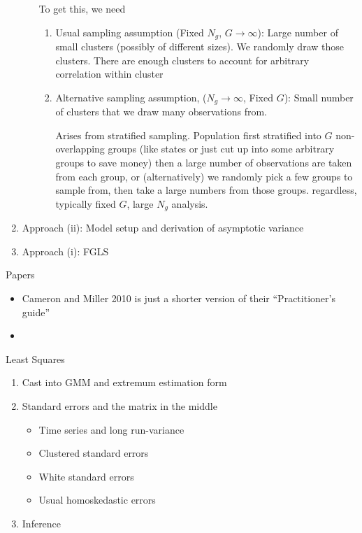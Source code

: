 \documentclass[12pt]{article}
\theoremstyle{plain}
\theoremstyle{definition}
\theoremstyle{remark}
\newcommand{\ra}{\rightarrow}
\begin{document}
\begin{enumerate}
\begin{enumerate}
        To get this, we need
        \begin{enumerate}
          \item Usual sampling assumption (Fixed $N_g$, $G\ra\infty$):
            Large number of small clusters (possibly of different sizes).
            We randomly draw those clusters.
            There are enough clusters to account for arbitrary correlation
            within cluster

          \item Alternative sampling assumption,
            ($N_g\ra\infty$, Fixed $G$):
            Small number of clusters that we draw many observations from.

            Arises from stratified sampling.
            Population first stratified into $G$ non-overlapping groups (like
            states or just cut up into some arbitrary groups to save money)
            then a large number of observations are taken from each group,
            or (alternatively) we randomly pick a few groups to sample from,
            then take a large numbers from those groups.
            regardless, typically fixed $G$, large $N_g$ analysis.
        \end{enumerate}
    \end{enumerate}


  \item
    Approach (ii):
    Model setup and derivation of asymptotic variance

  \item
    Approach (i): FGLS
\end{enumerate}
Papers
\begin{itemize}
  \item Cameron and Miller 2010 is just a shorter version of their
    ``Practitioner's guide''
  \item
\end{itemize}

\clearpage
Least Squares
\begin{enumerate}
  \item
    Cast into GMM and extremum estimation form
  \item
    Standard errors and the matrix in the middle
    \begin{itemize}
      \item Time series and long run-variance
      \item Clustered standard errors
      \item White standard errors
      \item Usual homoskedastic errors
    \end{itemize}
  \item Inference
\end{enumerate}
\end{document}
